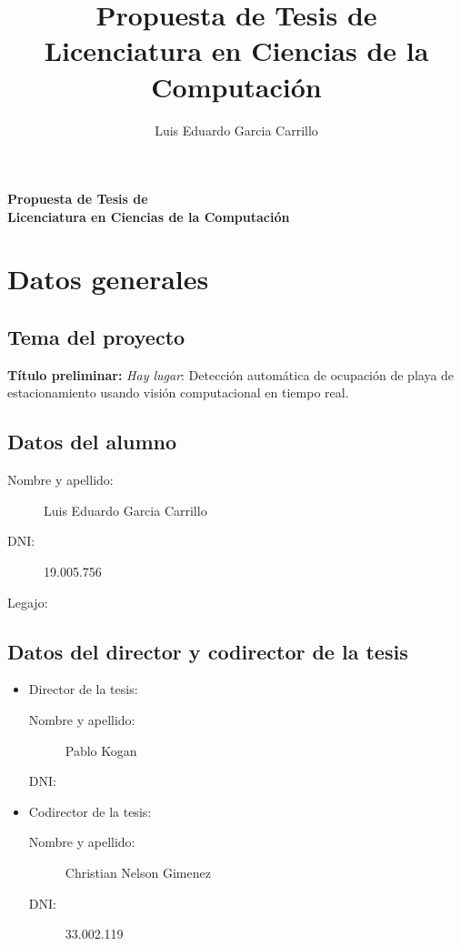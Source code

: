 \documentclass[12pt,a4paper]{article}
\title{Propuesta de Tesis de \\ Licenciatura en Ciencias de la Computación}
\author{Luis Eduardo Garcia Carrillo}
\newcommand{\gl}{\guillemotleft{}}
\newcommand{\gr}{\guillemotright{}}
\begin{document}
\renewcommand{\tablename}{Tabla}

\begin{center}
\noindent \bf \Large Propuesta de Tesis de \\[.5em]

Licenciatura en Ciencias de la Computación
\end{center}


\section{Datos generales}

\subsection{Tema del proyecto}
\textbf{Título preliminar:}
\textit{\gl Hay lugar\gr}: Detección automática de ocupación de playa de estacionamiento usando visión computacional en tiempo real.

\subsection{Datos del alumno}
\begin{description}
    \item[Nombre y apellido:] Luis Eduardo Garcia Carrillo
    \item[DNI:] 19.005.756
    \item[Legajo:]
\end{description}    

\subsection{Datos del director y codirector de la tesis}
\begin{itemize}
    \item Director de la tesis:
        \begin{description}
            \item[Nombre y apellido:] Pablo Kogan
            \item[DNI:]
        \end{description}
    
    \item Codirector de la tesis:
        \begin{description}
            \item[Nombre y apellido:] Christian Nelson Gimenez
            \item[DNI:] 33.002.119
        \end{description}
\end{itemize}
\end{document}

